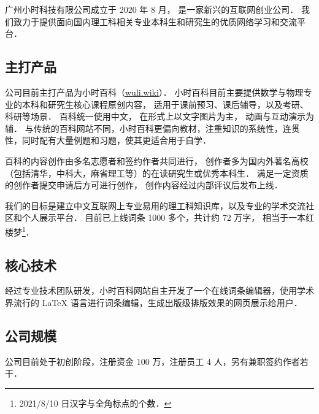 
广州小时科技有限公司成立于 2020 年 8 月， 是一家新兴的互联网创业公司． 我们致力于提供面向国内理工科相关专业本科生和研究生的优质网络学习和交流平台．

\subsection{主打产品}
公司目前主打产品为小时百科（\href{https://wuli.wiki}{wuli.wiki}）． 小时百科目前主要提供数学与物理专业的本科和研究生核心课程原创内容， 适用于课前预习、课后辅导，以及考研、科研等场景． 百科统一使用中文， 在形式上以文字图片为主， 动画与互动演示为辅． 与传统的百科网站不同，小时百科更偏向教材，注重知识的系统性，连贯性，同时配有大量例题和习题，使其更适合用于自学．

百科的内容创作由多名志愿者和签约作者共同进行， 创作者多为国内外著名高校（包括清华，中科大，麻省理工等）的在读研究生或优秀本科生． 满足一定资质的创作者提交申请后方可进行创作， 创作内容经过内部评议后发布上线．

我们的目标是建立中文互联网上专业易用的理工科知识库，以及专业的学术交流社区和个人展示平台． 目前已上线词条 1000 多个，共计约 72 万字， 相当于一本红楼梦\footnote{2021/8/10 日汉字与全角标点的个数．}．

\subsection{核心技术}
经过专业技术团队研发，小时百科网站自主开发了一个在线词条编辑器，使用学术界流行的 LaTeX 语言进行词条编辑，生成出版级排版效果的网页展示给用户．

\subsection{公司规模}
公司目前处于初创阶段，注册资金 100 万，注册员工 4 人，另有兼职签约作者若干．
